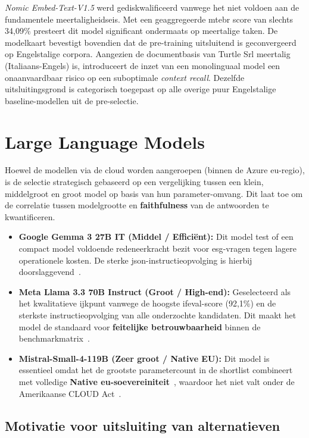 \textit{Nomic Embed-Text-V1.5} werd gediskwalificeerd vanwege het niet voldoen aan de fundamentele meertaligheidseis. Met een geaggregeerde \gls{mtebr} score van slechts 34,09\% presteert dit model significant ondermaats op meertalige taken. De modelkaart bevestigt bovendien dat de pre-training uitsluitend is geconvergeerd op Engelstalige corpora. Aangezien de documentbasis van Turtle Srl meertalig (Italiaans-Engels) is, introduceert de inzet van een monolinguaal model een onaanvaardbaar risico op een suboptimale \textit{context recall}. Dezelfde uitsluitingsgrond is categorisch toegepast op alle overige puur Engelstalige baseline-modellen uit de pre-selectie.

\section{Large Language Models}
\label{sec:shortlist-llm}

Hoewel de modellen via de cloud worden aangeroepen (binnen de Azure \gls{eu}-regio), is de selectie strategisch gebaseerd op een vergelijking tussen een klein, middelgroot en groot model op basis van hun parameter-omvang. Dit laat toe om de correlatie tussen modelgrootte en \textbf{faithfulness} van de antwoorden te kwantificeren.

\begin{itemize}
    \item \textbf{Google Gemma 3 27B IT (Middel / Efficiënt):} Dit model test of een compact model voldoende redeneerkracht bezit voor \gls{esg}-vragen tegen lagere operationele kosten. De sterke \gls{json}-instructieopvolging is hierbij doorslaggevend~\autocite{GemmaTeam2025}.
    \item \textbf{Meta Llama 3.3 70B Instruct (Groot / High-end):} Geselecteerd als het kwalitatieve ijkpunt vanwege de hoogste \gls{ifeval}-score (92,1\%) en de sterkste instructieopvolging van alle onderzochte kandidaten. Dit maakt het model de standaard voor \textbf{feitelijke betrouwbaarheid} binnen de benchmarkmatrix~\autocite{GrattafioriEtAl2024}.
    \item \textbf{Mistral-Small-4-119B (Zeer groot / Native EU):} Dit model is essentieel omdat het de grootste parametercount in de shortlist combineert met volledige \textbf{Native \gls{eu}-soevereiniteit}~\autocite{MistralAI2026}, waardoor het niet valt onder de Amerikaanse CLOUD Act~\autocite{Rutherford2019}.
\end{itemize}

\subsection{Motivatie voor uitsluiting van alternatieven}

